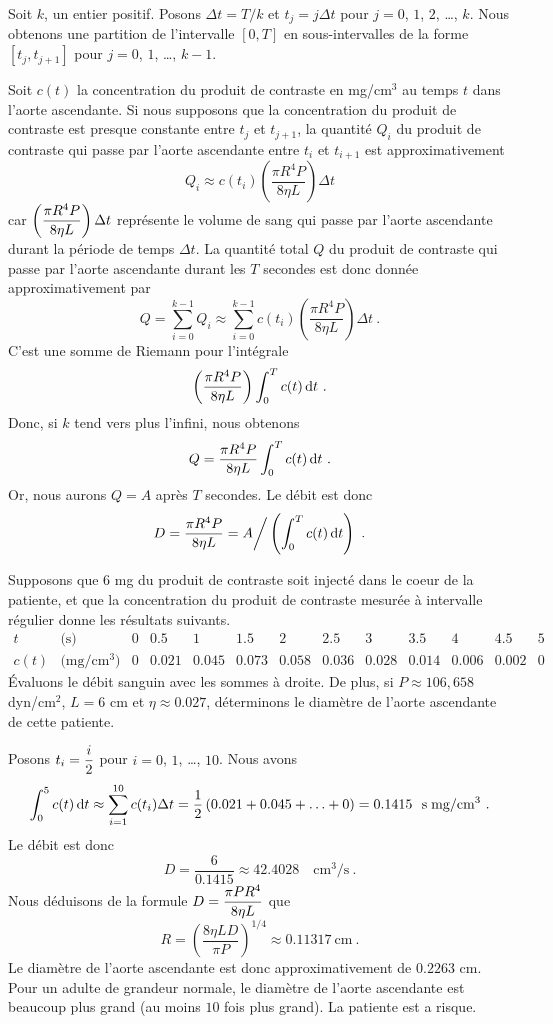 {\begin{egg}
Soit $k$, un entier positif.  Posons $\Delta t = T/k$ et
$t_j = j \Delta t$ pour $j=0$, $1$, $2$, \ldots, $k$.  Nous obtenons une
partition de l'intervalle $[0,T]$ en sous-intervalles de la forme
$[t_j,t_{j+1}]$ pour $j=0$, $1$, \ldots, $k-1$.

Soit $c(t)$ la concentration du produit de contraste en mg/cm$^3$ au
temps $t$ dans l'aorte ascendante.  Si nous supposons que la
concentration du produit de contraste est presque constante entre
$t_j$ et $t_{j+1}$, la quantité $Q_i$ du produit de contraste qui passe par
l'aorte ascendante entre $t_i$ et $t_{i+1}$ est approximativement
\[
Q_i \approx c(t_i) \left( \frac{\pi R^4 P}{8\eta L}\right) \Delta t
\]
car $\displaystyle \left( \frac{\pi R^4 P}{8\eta L}\right) \Delta t$
représente le volume de sang qui passe par l'aorte ascendante durant la
période de temps $\Delta t$.  La quantité total $Q$ du produit de contraste
qui passe par l'aorte ascendante durant les $T$ secondes est donc donnée
approximativement par
\[
Q = \sum_{i=0}^{k-1} Q_i \approx
\sum_{i=0}^{k-1} c(t_i) \left( \frac{\pi R^4 P}{8\eta L}\right) \Delta t \ .
\]
C'est une somme de Riemann pour l'intégrale
\[
\left( \frac{\pi R^4 P}{8\eta L}\right) \int_0^T c(t) \,\mathrm{d}t \ .
\]
Donc, si $k$ tend vers plus l'infini, nous obtenons
\[
Q = \frac{\pi R^4 P}{8\eta L} \int_0^T c(t) \,\mathrm{d}t \ .
\]
Or, nous aurons $Q=A$ après $T$ secondes. Le débit est donc
\[
D = \frac{\pi R^4 P}{8\eta L} = A\bigg/\left(\int_0^T c(t) \dx{t}\right) \ .
\]

Supposons que $6$ mg du produit de contraste soit injecté dans le coeur de la
patiente, et que la concentration du produit de contraste mesurée à
intervalle régulier donne les résultats suivants.
\[
\begin{array}{cr|c|c|c|c|c|c|c|c|c|c|c}
t &\text{(s)} & 0 & 0.5 & 1 & 1.5 & 2 & 2.5 & 3 & 3.5 & 4 & 4.5 & 5 \\
\hline
c(t) & \text{(mg/cm$^3$)} & 0 & 0.021 & 0.045 & 0.073 & 0.058 & 0.036 &
0.028 & 0.014 & 0.006 & 0.002 & 0
\end{array}
\]
Évaluons le débit sanguin avec les sommes à droite.  De plus, si
$P \approx 106,658$ dyn/cm$^2$, $L=6$ cm et $\eta \approx 0.027$,
déterminons le diamètre de l'aorte ascendante de cette patiente.

Posons $\displaystyle t_i = \frac{i}{2}$ pour $i=0$, $1$, \ldots,
$10$.  Nous avons
\[
\int_0^{5} c(t) \,\mathrm{d}t \approx \sum_{i=1}^{10} c(t_i) \Delta t
= \frac{1}{2} \left( 0.021 + 0.045 + \ldots + 0\right) = 0.1415
\ \text{ s\;mg/cm${^3}$} \ .
\]
Le débit est donc
\[
D = \frac{6}{0.1415} \approx 42.4028 \quad \text{cm$^3$/s} \ .
\]
Nous déduisons de la formule
$\displaystyle D = \frac{\pi P R^4}{8\eta L}$ que
\[
R = \left(\frac{8\eta L D}{\pi P}\right)^{1/4} \approx 0.11317 \
\text{cm} \ .
\]
Le diamètre de l'aorte ascendante est donc approximativement de $0.2263$ cm.
Pour un adulte de grandeur normale, le diamètre de l'aorte ascendante est
beaucoup plus grand (au moins $10$ fois plus grand).  La patiente est
a risque.
\end{egg}

}
